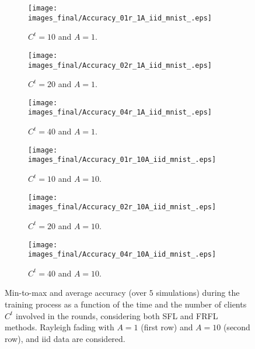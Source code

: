 \documentclass[10pt, conference, letterpaper]{IEEEtran}
\begin{document}
	
	\begin{figure*}[t!]
		\centering
		\begin{subfigure}{0.32\textwidth}
			\centering
			\texttt{[image: images\_final/Accuracy\_01r\_1A\_iid\_mnist\_.eps]}  
			\caption{$C^t= 10$ and $A=1$.}
			\label{fig:10-1}
		\end{subfigure}
		\begin{subfigure}{0.32\textwidth}
			\centering
			\texttt{[image: images\_final/Accuracy\_02r\_1A\_iid\_mnist\_.eps]}  
			\caption{$C^t= 20$ and $A=1$.}
			\label{fig:20-1}
		\end{subfigure}
		\begin{subfigure}{0.32\textwidth}
			\centering
			\texttt{[image: images\_final/Accuracy\_04r\_1A\_iid\_mnist\_.eps]}  
			\caption{$C^t= 40$ and $A=1$.}
			\label{fig:40-1}
		\end{subfigure}
		\begin{subfigure}{0.32\textwidth}
			\centering
			\texttt{[image: images\_final/Accuracy\_01r\_10A\_iid\_mnist\_.eps]}  
			\caption{$C^t=10$ and $A=10$.}
			\label{fig:10-10}
		\end{subfigure}
		\begin{subfigure}{0.32\textwidth}
			\centering
			\texttt{[image: images\_final/Accuracy\_02r\_10A\_iid\_mnist\_.eps]}  
			\caption{$C^t= 20$ and $A=10$.}
			\label{fig:20-10}
		\end{subfigure}
		\begin{subfigure}{0.32\textwidth}
			\centering
			\texttt{[image: images\_final/Accuracy\_04r\_10A\_iid\_mnist\_.eps]}  
			\caption{$C^t= 40$ and $A=10$.}
			\label{fig:40-10}
		\end{subfigure}
		\caption{Min-to-max and average accuracy (over $5$ simulations) during the training process as a function of the time and the number of clients $C^t$ involved in the rounds, considering both SFL and FRFL methods. Rayleigh fading with $A=1$ (first row) and $A=10$ (second row), and \gls{iid} data are considered.}
		\label{fig:iid_rayleigh_curves}
	\end{figure*}
	
\end{document}
